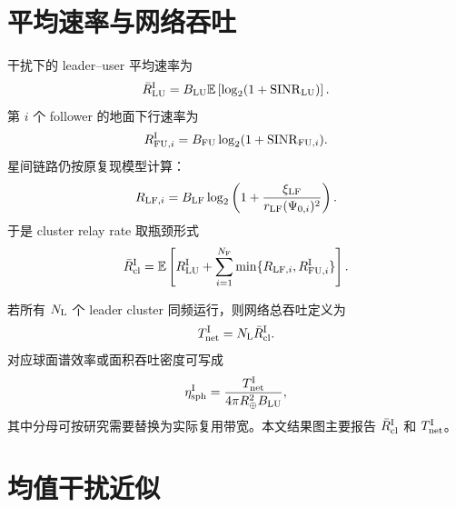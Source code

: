 \documentclass[UTF8,a4paper,11pt]{ctexart}
\newcommand{\Rearth}{R_{\oplus}}
\newcommand{\NL}{N_{\rm L}}
\newcommand{\NF}{N_{\rm F}}
\newcommand{\E}{\mathbb{E}}
\newcommand{\SINR}{\operatorname{SINR}}
\begin{document}
\section{平均速率与网络吞吐}

干扰下的 leader--user 平均速率为
\begin{equation}
    \bar R_{\rm LU}^{\rm I}
    =
    B_{\rm LU}
    \E\left[
    \log_2(1+\SINR_{\rm LU})
    \right].
\end{equation}
第 $i$ 个 follower 的地面下行速率为
\begin{equation}
    R_{{\rm FU},i}^{\rm I}
    =
    B_{\rm FU}
    \log_2(1+\SINR_{{\rm FU},i}).
\end{equation}
星间链路仍按原复现模型计算：
\begin{equation}
    R_{{\rm LF},i}
    =
    B_{\rm LF}
    \log_2
    \left(
    1+
    \frac{\xi_{\rm LF}}{r_{\rm LF}(\Psi_{0,i})^2}
    \right).
\end{equation}
于是 cluster relay rate 取瓶颈形式
\begin{equation}
    \bar R_{\rm cl}^{\rm I}
    =
    \E
    \left[
    R_{\rm LU}^{\rm I}
    +
    \sum_{i=1}^{\NF}
    \min\{R_{{\rm LF},i},R_{{\rm FU},i}^{\rm I}\}
    \right].
    \label{eq:cluster-rate-interference}
\end{equation}

若所有 $\NL$ 个 leader cluster 同频运行，则网络总吞吐定义为
\begin{equation}
    T_{\rm net}^{\rm I}
    =
    \NL \bar R_{\rm cl}^{\rm I}.
    \label{eq:network-throughput}
\end{equation}
对应球面谱效率或面积吞吐密度可写成
\begin{equation}
    \eta_{\rm sph}^{\rm I}
    =
    \frac{T_{\rm net}^{\rm I}}{4\pi \Rearth^2 B_{\rm LU}},
\end{equation}
其中分母可按研究需要替换为实际复用带宽。本文结果图主要报告
$\bar R_{\rm cl}^{\rm I}$ 和 $T_{\rm net}^{\rm I}$。

\section{均值干扰近似}
\end{document}
